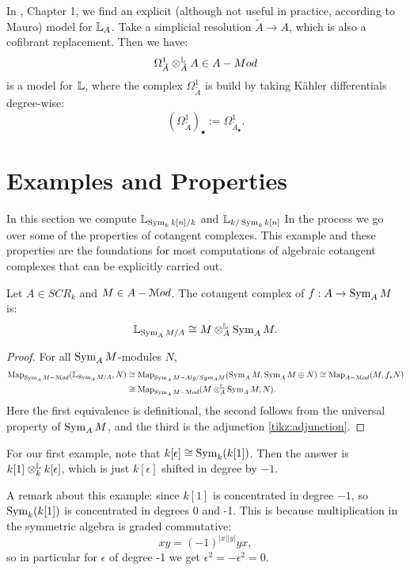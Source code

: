 In \cite{HAG-II}, Chapter 1, we find an explicit (although not useful in practice, according to Mauro) model 
for $\mathbb L_A$. Take a simplicial resolution $\tilde A \to A$, which is also a cofibrant replacement. Then we have:
\[	 \Omega_{\tilde A}^1 \otimes^{\mathbb L}_{\tilde A} A \in A-Mod	\]
is a model for $\mathbb L$, where the complex $\Omega_{\tilde A}^1$ is build by taking K\"ahler differentials degree-wise:
\[	(\Omega_{\tilde A}^1)_{\bullet} := \Omega^1_{\tilde A_{\bullet}}.	\]





\section{Examples and Properties}
\label{sect:cc_eg}

In this section we compute $\mathbb L_{\operatorname{Sym}_k k[n]/k}$ and $\mathbb L_{k/\operatorname{Sym}_k k[n]}$ In the process we go over some 
of the properties of cotangent complexes. This example and these properties are the foundations for most computations
of algebraic cotangent complexes that can be explicitly carried out.

\begin{lem}
Let $A \in SCR_k$ and $M \in A-\mathcal M od$. The cotangent complex of $f: A \to \operatorname{Sym}_A M$ is:
\[	\mathbb L_{\operatorname{Sym}_A M /A}\cong M \otimes^{\mathbb L}_A \operatorname{Sym}_A M .	\]
\end{lem}
\begin{proof}
For all $\operatorname{Sym}_A M$-modules $N$,
\begin{align*}
	\operatorname{Map}_{\operatorname{Sym}_A M -\mathcal M od}(\mathbb L_{\operatorname{Sym}_A M/A}, N) &\cong \operatorname{Map}_{\operatorname{Sym}_A M -Alg/Sym_A M}(\operatorname{Sym}_A M, \operatorname{Sym}_A M\oplus N ) 
	\cong \operatorname{Map}_{A-\mathcal M od}(M, f_* N) \\
&\cong \operatorname{Map}_{\operatorname{Sym}_A M - \mathcal M od}(M \otimes^{\mathbb L}_A \operatorname{Sym}_A M ,N).
\end{align*}
Here the first equivalence is definitional, the second follows from the universal property of $\operatorname{Sym}_A M$, and the third is
the adjunction \ref{tikz:adjunction}.
\end{proof}

\begin{eg}
\label{eg:first_cotangent}
For our first example, note that $k[\epsilon] \cong \operatorname{Sym}_k(k[1])$. Then the answer is $k[1] \otimes^{\mathbb L}_k k[\epsilon]$, which is just 
$k[\epsilon]$ shifted in degree by $-1$.

A remark about this example: since $k[1]$ is concentrated in degree $-1$, so $\operatorname{Sym}_k(k[1])$ is concentrated in degrees 0 and -1.
This is because multiplication in the symmetric algebra is graded commutative:
\[	x y = (-1)^{|x||y|} yx,	\]
so in particular for $\epsilon$ of degree -1 we get $\epsilon^2 = -\epsilon^2 = 0$.
\end{eg}

